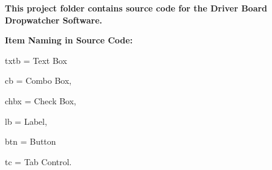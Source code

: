 {\bfseries{This project folder contains source code for the Driver Board Dropwatcher Software.}}

{\bfseries{Item Naming in Source Code\+:}}
\begin{DoxyItemize}
\item txtb = Text Box
\item cb = Combo Box,
\item chbx = Check Box,
\item lb = Label,
\item btn = Button
\item tc = Tab Control. 
\end{DoxyItemize}